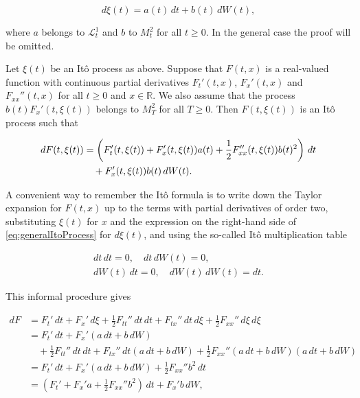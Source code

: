 \begin{equation}
d\xi(t) = a(t) \, dt + b(t) \, dW(t),
\label{eq:generalItoProcess}
\end{equation}

where $a$ belongs to $\mathcal{L}_t^1$ and $b$ to $M_t^2$ for all $t \geq 0$. In the general case the proof will be omitted.

\begin{Theorem}
\label{th:7.6}
Let $\xi(t)$ be an Itô process as above. Suppose that $F(t, x)$ is a real-valued function with continuous partial derivatives $F_t'(t, x)$, $F_x'(t, x)$ and $F_{xx}''(t, x)$ for all $t \geq 0$ and $x \in \mathbb{R}$. We also assume that the process $b(t) F_x'(t, \xi(t))$ belongs to $M_T^2$ for all $T \geq 0$. Then $F(t, \xi(t))$ is an Itô process such that

\begin{align}
dF(t, \xi(t)) & = \left(F_t'(t, \xi(t)) + F_x'(t, \xi(t)) a(t) + \frac{1}{2} F_{xx}''(t, \xi(t)) b(t)^2\right) \, dt \label{eq:ItoFormulaGeneral} \\
& \quad + F_x'(t, \xi(t)) b(t) \, dW(t). \notag
\end{align}
\end{Theorem}

A convenient way to remember the Itô formula is to write down the Taylor expansion for $F(t, x)$ up to the terms with partial derivatives of order two, substituting $\xi(t)$ for $x$ and the expression on the right-hand side of \eqref{eq:generalItoProcess} for $d\xi(t)$, and using the so-called Itô multiplication table

\begin{equation}
\begin{array}{l}
dt \, dt = 0, \quad dt \, dW(t) = 0, \\
dW(t) \, dt = 0, \quad dW(t) \, dW(t) = dt.
\end{array}
\label{eq:ItoMultiplicationTable}
\end{equation}

This informal procedure gives

\begin{align}
dF & = F_t' \, dt + F_x' \, d\xi + \frac{1}{2} F_{tt}'' \, dt \, dt + F_{tx}'' \, dt \, d\xi + \frac{1}{2} F_{xx}'' \, d\xi \, d\xi \label{eq:TaylorInformal1} \\
& = F_t' \, dt + F_x'(a \, dt + b \, dW) \label{eq:TaylorInformal2} \\
& \quad + \frac{1}{2} F_{tt}'' \, dt \, dt + F_{tx}'' \, dt (a \, dt + b \, dW) + \frac{1}{2} F_{xx}'' (a \, dt + b \, dW) (a \, dt + b \, dW) \label{eq:TaylorInformal3} \\
& = F_t' \, dt + F_x'(a \, dt + b \, dW) + \frac{1}{2} F_{xx}'' b^2 \, dt \label{eq:TaylorInformal4} \\
& = \left(F_t' + F_x' a + \frac{1}{2} F_{xx}'' b^2\right) \, dt + F_x' b \, dW, \label{eq:TaylorInformal5}
\end{align}

